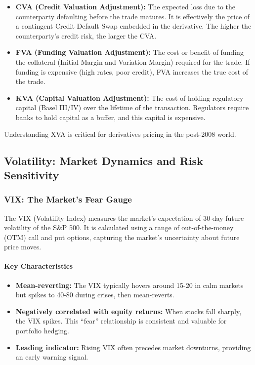 \begin{itemize}
    \item \textbf{CVA (Credit Valuation Adjustment):} The expected loss due to the counterparty defaulting before the trade matures. It is effectively the price of a contingent Credit Default Swap embedded in the derivative. The higher the counterparty's credit risk, the larger the CVA.
    
    \item \textbf{FVA (Funding Valuation Adjustment):} The cost or benefit of funding the collateral (Initial Margin and Variation Margin) required for the trade. If funding is expensive (high rates, poor credit), FVA increases the true cost of the trade.
    
    \item \textbf{KVA (Capital Valuation Adjustment):} The cost of holding regulatory capital (Basel III/IV) over the lifetime of the transaction. Regulators require banks to hold capital as a buffer, and this capital is expensive.
\end{itemize}

Understanding XVA is critical for derivatives pricing in the post-2008 world.

\subsection{Volatility: Market Dynamics and Risk Sensitivity}

\subsubsection{VIX: The Market's Fear Gauge}

The VIX (Volatility Index) measures the market's expectation of 30-day future volatility of the S\&P 500. It is calculated using a range of out-of-the-money (OTM) call and put options, capturing the market's uncertainty about future price moves.

\paragraph{Key Characteristics}
\begin{itemize}
    \item \textbf{Mean-reverting:} The VIX typically hovers around 15-20 in calm markets but spikes to 40-80 during crises, then mean-reverts.
    \item \textbf{Negatively correlated with equity returns:} When stocks fall sharply, the VIX spikes. This ``fear'' relationship is consistent and valuable for portfolio hedging.
    \item \textbf{Leading indicator:} Rising VIX often precedes market downturns, providing an early warning signal.
\end{itemize}

